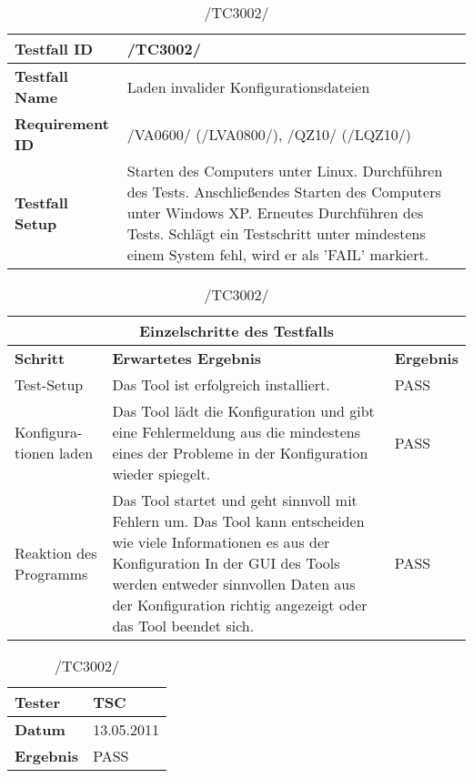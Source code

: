 \begin{table}[h]
\caption{/TC3002/}
\label{tab:TC3002}
\begin{center}
\begin{tabular}{|p{3.5cm}|p{11cm}|}
\hline
\textbf{Testfall ID} & /TC3002/\\
\hline
\textbf{Testfall Name} & Laden invalider Konfigurationsdateien\\
\hline
\textbf{Requirement ID} & /VA0600/ (/LVA0800/), /QZ10/ (/LQZ10/)\\
\hline
\textbf{Testfall Setup} & Starten des Computers unter Linux. Durchführen des Tests.
Anschließendes Starten des Computers unter Windows XP. Erneutes Durchführen des Tests. Schlägt ein Testschritt unter mindestens einem System fehl, wird er als 'FAIL' markiert.\\
\hline
\end{tabular}
\begin{tabular}{|p{4cm}|p{7.8cm}|p{2.3cm}|}
\multicolumn{3}{|c|}{\textbf{Einzelschritte des Testfalls}} \\
\hline
\textbf{Schritt} & \textbf{Erwartetes Ergebnis} & \textbf{Ergebnis}\\
\hline
Test-Setup &  Das Tool ist erfolgreich installiert. & PASS\\
\hline
Konfigura- tionen laden & Das Tool lädt die Konfiguration und gibt eine
Fehlermeldung aus die mindestens eines der Probleme in der Konfiguration wieder
spiegelt. & PASS\\
\hline
Reaktion des Programms & Das Tool startet und geht sinnvoll mit Fehlern um. Das
Tool kann entscheiden wie viele Informationen es aus der Konfiguration In der
GUI des Tools werden entweder sinnvollen Daten aus der Konfiguration richtig
angezeigt oder das Tool beendet sich. & PASS\\
\hline
\end{tabular}

\begin{tabular}{|p{3.5cm}|p{11cm}|}
\textbf{Tester} & TSC\\
\hline
\textbf{Datum} & 13.05.2011\\
\hline
\textbf{Ergebnis} & PASS\\
\hline
\end{tabular}
\end{center}
\label{default}
\end{table}

